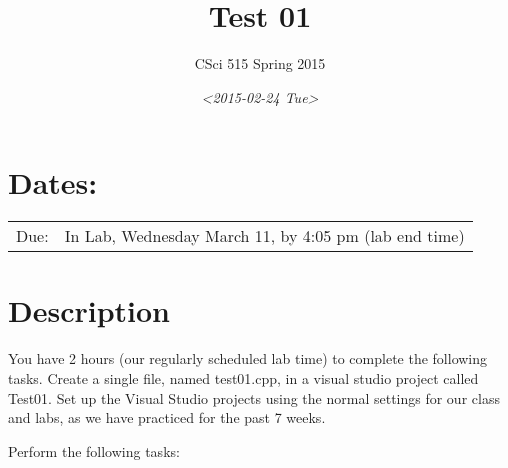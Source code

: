 \documentclass[11pt]{article}
\author{CSci 515 Spring 2015}
\date{\textit{<2015-02-24 Tue>}}
\title{Test 01}
\begin{document}
\maketitle

\section*{Dates:}
\label{sec-1}
\begin{center}
\begin{tabular}{ll}
Due: & In Lab, Wednesday March 11, by 4:05 pm (lab end time)\\
\end{tabular}
\end{center}
\section*{Description}
\label{sec-2}
You have 2 hours (our regularly scheduled lab time) to complete the
following tasks.  Create a single file, named test01.cpp, in a visual
studio project called Test01.  Set up the Visual Studio projects using
the normal settings for our class and labs, as we have practiced for
the past 7 weeks.

Perform the following tasks:
\end{document}
